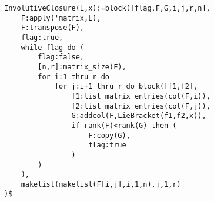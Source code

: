\noindent
\begin{minipage}[t]{\textwidth}
\color{blue}
\begin{verbatim}
InvolutiveClosure(L,x):=block([flag,F,G,i,j,r,n],
    F:apply('matrix,L),
    F:transpose(F),
    flag:true,
    while flag do (
        flag:false,
        [n,r]:matrix_size(F),
        for i:1 thru r do 
            for j:i+1 thru r do block([f1,f2],
                f1:list_matrix_entries(col(F,i)),
                f2:list_matrix_entries(col(F,j)),
                G:addcol(F,LieBracket(f1,f2,x)),
                if rank(F)<rank(G) then (
                    F:copy(G),
                    flag:true
                )       
        )
    ),
    makelist(makelist(F[i,j],i,1,n),j,1,r)
)$
\end{verbatim}
\end{minipage}
